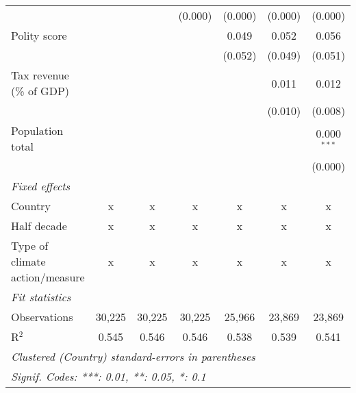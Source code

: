 \begin{tabular}{lcccccc}
                                                                         &               &                & (0.000)        & (0.000)        & (0.000)        & (0.000)\\   
   Polity score                                                          &               &                &                & 0.049          & 0.052          & 0.056\\   
                                                                         &               &                &                & (0.052)        & (0.049)        & (0.051)\\   
   Tax revenue (\% of GDP)                                               &               &                &                &                & 0.011          & 0.012\\   
                                                                         &               &                &                &                & (0.010)        & (0.008)\\   
   Population total                                                      &               &                &                &                &                & 0.000$^{***}$\\   
                                                                         &               &                &                &                &                & (0.000)\\   
   \emph{Fixed effects}\\
   Country                                                               & x             & x              & x              & x              & x              & x\\  
   Half decade                                                           & x             & x              & x              & x              & x              & x\\  
   Type of climate action/measure                                        & x             & x              & x              & x              & x              & x\\  
   \midrule \emph{Fit statistics}\\
   Observations                                                          & 30,225        & 30,225         & 30,225         & 25,966         & 23,869         & 23,869\\  
   R$^2$                                                                 & 0.545         & 0.546          & 0.546          & 0.538          & 0.539          & 0.541\\  
   \midrule
   \multicolumn{7}{l}{\emph{Clustered (Country) standard-errors in parentheses}}\\
   \multicolumn{7}{l}{\emph{Signif. Codes: ***: 0.01, **: 0.05, *: 0.1}}\\
\end{tabular}
\par\endgroup



